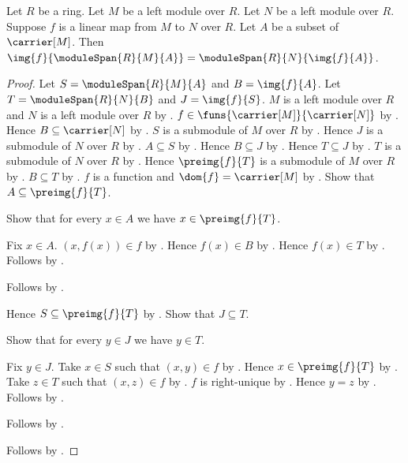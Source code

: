 \begin{theorem}\label{linear_map_image_of_span}
    Let $R$ be a ring.
    Let $M$ be a left module over $R$.
    Let $N$ be a left module over $R$.
    Suppose $f$ is a linear map from $M$ to $N$ over $R$.
    Let $A$ be a subset of $\carrier[M]$.
    Then
        $\img{f}{\moduleSpan{R}{M}{A}}
            =\moduleSpan{R}{N}{\img{f}{A}}$.
\end{theorem}
\begin{proof}
    Let $S=\moduleSpan{R}{M}{A}$ and
        $B=\img{f}{A}$.
    Let $T=\moduleSpan{R}{N}{B}$ and $J=\img{f}{S}$.
    $M$ is a left module over $R$ and
        $N$ is a left module over $R$ by
        .
    $f\in\funs{\carrier[M]}{\carrier[N]}$ by
        .
    Hence $B\subseteq\carrier[N]$ by
        .
    $S$ is a submodule of $M$ over $R$ by
        .
    Hence $J$ is a submodule of $N$ over $R$ by
        .
    $A\subseteq S$ by .
    Hence $B\subseteq J$ by .
    Hence $T\subseteq J$ by .
    $T$ is a submodule of $N$ over $R$ by
        .
    Hence $\preimg{f}{T}$ is a submodule of $M$ over $R$ by
        .
    $B\subseteq T$ by .
    $f$ is a function and $\dom{f}=\carrier[M]$ by
        .
    Show that $A\subseteq\preimg{f}{T}$.
    \begin{subproof}
        Show that for every $x\in A$ we have $x\in\preimg{f}{T}$.
        \begin{subproof}
            Fix $x\in A$.
            $(x,f(x))\in f$ by .
            Hence $f(x)\in B$ by .
            Hence $f(x)\in T$ by .
            Follows by .
        \end{subproof}
        Follows by .
    \end{subproof}
    Hence $S\subseteq\preimg{f}{T}$ by .
    Show that $J\subseteq T$.
    \begin{subproof}
        Show that for every $y\in J$ we have $y\in T$.
        \begin{subproof}
            Fix $y\in J$.
            Take $x\in S$ such that $(x,y)\in f$ by .
            Hence $x\in\preimg{f}{T}$ by .
            Take $z\in T$ such that $(x,z)\in f$ by
                .
            $f$ is right-unique by .
            Hence $y=z$ by .
            Follows by \auto.
        \end{subproof}
        Follows by .
    \end{subproof}
    Follows by .
\end{proof}


